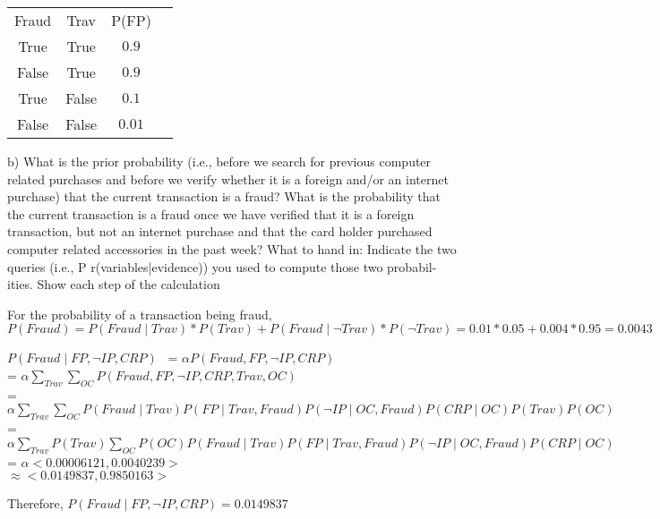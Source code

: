 \documentclass{article}
\begin{document}
\begin{center}
\begin{tabular}{ |c|c|c|c| } 
 \hline
Fraud & Trav & P(FP)  \\ 
 True & True & $0.9$\\
 False & True & $0.9$\\
 True & False & $0.1$\\
 False & False & $0.01$\\
 \hline
\end{tabular}
\end{center}


b) What is the prior probability (i.e., before we search for previous computer related purchases and before we verify whether it is a foreign and/or an internet purchase) that the current transaction is a fraud? What is the probability that the current transaction is a fraud once we have verified that it is a foreign transaction, but not an internet purchase and that the card holder purchased computer related accessories in the past week?
What to hand in: Indicate the two queries (i.e., P r(variables|evidence)) you used to compute those two probabil- ities. Show each step of the calculation

For the probability of a transaction being fraud, 
$P(Fraud) = P(Fraud\mid Trav) * P(Trav) + P(Fraud\mid \neg Trav) * P(\neg Trav) = 0.01 * 0.05 + 0.004 * 0.95 = 0.0043$

$P(Fraud \mid FP, \neg IP, CRP)$
\
= $\alpha P(Fraud, FP, \neg IP, CRP) $
\\= $\alpha \sum_{Trav} \sum_{OC}P(Fraud, FP, \neg IP, CRP, Trav, OC)$
\\= $\alpha \sum_{Trav} \sum_{OC}P(Fraud\mid Trav)P(FP\mid Trav,Fraud)P(\neg IP\mid OC,Fraud)P(CRP\mid OC)P(Trav)P(OC)$
\\= $\alpha \sum_{Trav}P(Trav)\sum_{OC}P(OC)P(Fraud\mid Trav)P(FP\mid Trav,Fraud)P(\neg IP\mid OC,Fraud)P(CRP\mid OC)$
\\= $\alpha <0.00006121,0.0040239>$
\\ $ \approx <0.0149837,0.9850163>$

Therefore, $P(Fraud \mid FP, \neg IP, CRP) = 0.0149837$
\end{document}
